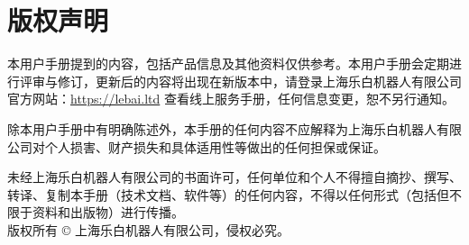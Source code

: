 \chapter*{版权声明}

本用户手册提到的内容，包括产品信息及其他资料仅供参考。本用户手册会定期进行评审与修订，更新后的内容将出现在新版本中，请登录上海乐白机器人有限公司官方网站：\url{https://lebai.ltd} 查看线上服务手册，任何信息变更，恕不另行通知。

除本用户手册中有明确陈述外，本手册的任何内容不应解释为上海乐白机器人有限公司对个人损害、财产损失和具体适用性等做出的任何担保或保证。

未经上海乐白机器人有限公司的书面许可，任何单位和个人不得擅自摘抄、撰写、转译、复制本手册（技术文档、软件等）的任何内容，不得以任何形式（包括但不限于资料和出版物）进行传播。\\

版权所有 © 上海乐白机器人有限公司，侵权必究。
